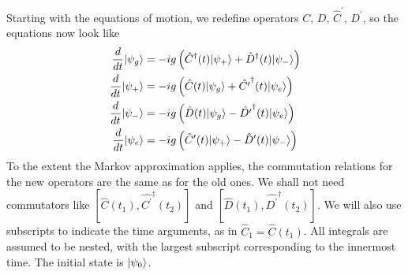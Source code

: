 \documentclass[aps,pra,twocolumn,floatfix,superscriptaddress]{revtex4}
\begin{document}
Starting with the equations of motion, we redefine operators $C$, $D$, $\hat C^\prime$, $D^\prime$, so the equations now look like
\begin{subequations}
\begin{align}
\frac{d}{dt}|\psi_{g}\rangle &= -ig \left(\hat C^\dagger(t) |\psi_{+}\rangle + \hat D^\dagger(t) |\psi_{-}\rangle \right) \label{a1a} \\
\frac{d}{dt}|\psi_{+}\rangle &= -ig \left( \hat C(t) |\psi_{g}\rangle +  \hat {C^\prime}^\dagger(t) |\psi_{e}\rangle \right) \label{a1b} \\
\frac{d}{dt}|\psi_{-}\rangle &= -ig \left( \hat D(t) |\psi_{g}\rangle -  \hat {D^\prime}^\dagger(t) |\psi_{e}\rangle \right) \label{a1c} \\
\frac{d}{dt}|\psi_{e}\rangle &= -ig \left(\hat C^\prime(t) |\psi_{+}\rangle - \hat D^\prime(t) |\psi_{-}\rangle \right) \label{a1d}
\end{align} 
\label{a1}
\end{subequations}
To the extent the Markov approximation applies, the commutation relations for the new operators are the same as for the old ones. We shall not need commutators like  $[\hat C(t_1),\hat {C^\prime}^\dagger(t_2)]$ and $[\hat D(t_1),\hat {D^\prime}^\dagger(t_2)]$.  We will also use subscripts to indicate the time arguments, as in $\hat C_1 = \hat C(t_1)$. All integrals are assumed to be nested, with the largest subscript corresponding to the innermost time. The initial state is $|\psi_0\rangle$.
\end{document}
